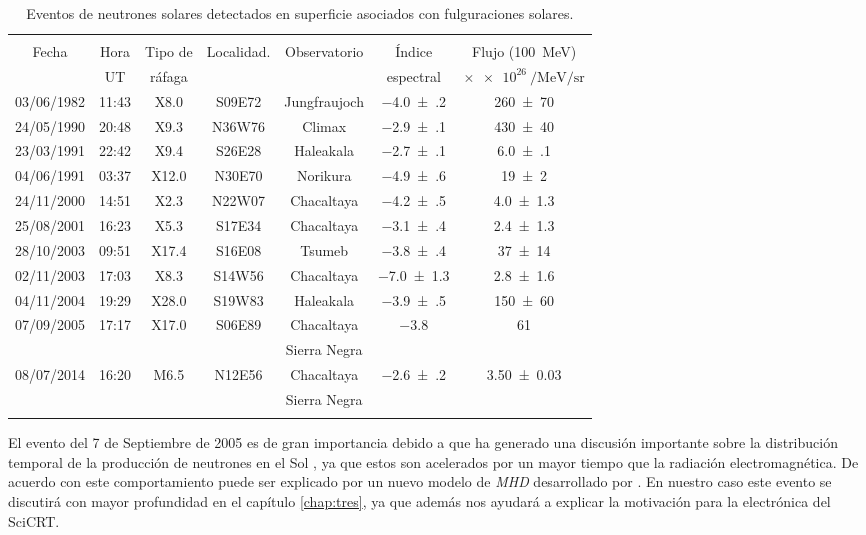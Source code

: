\begin{table}
\caption{Eventos de neutrones solares detectados en superficie asociados con fulguraciones solares.}
\label{table:eventos-neutrones}

\begin{tabular}{ccccccc}
\multicolumn{7}{c}{}\\
\cmidrule(r){1-7}
Fecha & Hora & Tipo de & Localidad. & Observatorio & Índice & Flujo (\SI{100}{\mega\electronvolt})\\
 & UT & ráfaga &  &  & espectral & $\times\SI{e26}{\per\mega\electronvolt\per\steradian}$ \\
\addlinespace[5pt]
\cmidrule(r){1-7}
\num{03}/\num{06}/\num{1982} & 11:43 & X8.0 & S09E72 & Jungfraujoch & \num{-4.0(2)} & \num{260(70)}\\
\num{24}/\num{05}/\num{1990} & 20:48 & X9.3 & N36W76 & Climax & \num{-2.9(1)} & \num{430(40)}\\
\num{23}/\num{03}/\num{1991} & 22:42 & X9.4 & S26E28 & Haleakala & \num{-2.7(1)} & \num{6.0(1)}\\
\num{04}/\num{06}/\num{1991} & 03:37 & X12.0 & N30E70 & Norikura & \num{-4.9(6)} & \num{19(2)}\\
\num{24}/\num{11}/\num{2000} & 14:51 & X2.3 & N22W07 & Chacaltaya & \num{-4.2(5)} & \num{4.0(13)}\\
\num{25}/\num{08}/\num{2001} & 16:23 & X5.3 & S17E34 & Chacaltaya & \num{-3.1(4)} & \num{2.4(13)}\\
\num{28}/\num{10}/\num{2003} & 09:51 & X17.4 & S16E08 & Tsumeb & \num{-3.8(4)} & \num{37(14)}\\
\num{02}/\num{11}/\num{2003} & 17:03 & X8.3 & S14W56 & Chacaltaya & \num{-7.0(13)} & \num{2.8(16)}\\
\num{04}/\num{11}/\num{2004} & 19:29 & X28.0 & S19W83 & Haleakala & \num{-3.9(5)} & \num{150(60)}\\
\num{07}/\num{09}/\num{2005} & 17:17 & X17.0 & S06E89 & Chacaltaya & \num{-3.8} & \num{61}\\
 &  &  &  & Sierra Negra &  & \\
\num{08}/\num{07}/\num{2014} & 16:20 & M6.5 & N12E56 & Chacaltaya & \num{-2.6(2)} & \num{3.50(3)}\\
 &  &  &  & Sierra Negra &  & \\
\addlinespace[5pt]
\bottomrule

\end{tabular}
\end{table}

El evento del \num{7} de Septiembre de \num{2005} es de gran importancia debido a que ha generado una discusión importante sobre la distribución temporal de la producción de neutrones en el Sol \cite{sako06}, ya que estos son acelerados por un mayor tiempo que la radiación electromagnética. De acuerdo con \cite{watanabe09} este comportamiento puede ser explicado por un nuevo modelo de \emph{MHD} desarrollado por  \cite{hua02}. En nuestro caso este evento se discutirá con mayor profundidad en el capítulo \ref{chap:tres}, ya que además nos ayudará a explicar la motivación para la electrónica del SciCRT.
